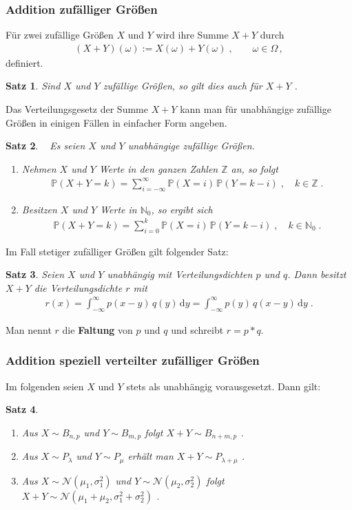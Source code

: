 \documentclass[ngerman,draft,parskip=half,twoside]{scrartcl}
\newtheorem{thm}{Satz}[section]
\newcommand*{\N}{\mathbb{N}}      %
\newcommand*{\Z}{\mathbb{Z}}      %
\newcommand*{\WKM}{\mathbb{P}}      %
\begin{document}
\subsubsection{Addition zufälliger Größen}
Für zwei zufällige Größen $X$  und $Y$ wird ihre Summe $X+Y$ durch
\begin{gather*}
  (X+Y)(\omega):=X(\omega)+Y(\omega)\;,\qquad \omega\in\Omega\,,
\end{gather*}
definiert.
\begin{thm}
Sind $X$ und $Y$ zufällige Größen, so gilt dies auch für $X+Y$ .
\end{thm}
Das Verteilungsgesetz der Summe $X+Y$ kann man für unabhängige zufällige Größen in einigen
Fällen in einfacher Form angeben.
\begin{thm}~
Es seien $X$ und $Y$ unabhängige zufällige Größen.
\begin{enumerate}
\item
Nehmen $X$ und $Y$ Werte in den ganzen Zahlen $\Z$ an, so folgt
  \begin{gather*}
    \WKM(X+Y=k)=\sum_{i=-\infty}^\infty\WKM(X=i)\,\WKM(Y=k-i)\;,\quad k\in \Z\;.
  \end{gather*}
\item
Besitzen $X$ und $Y$ Werte in $\N_0$, so ergibt sich
  \begin{gather*}
    \WKM(X+Y=k)=\sum_{i=0}^k\WKM(X=i)\,\WKM(Y=k-i)\;,\quad k\in \N_0\;.
  \end{gather*}
\end{enumerate}
\end{thm}
Im Fall stetiger zufälliger Größen gilt folgender Satz:
\begin{thm}
Seien $X$ und $Y$ unabhängig mit Verteilungsdichten $p$ und $q$. Dann besitzt $X+Y$
die Verteilungsdichte $r$  mit
  \begin{gather*}
    r(x)=\int_{-\infty}^\infty p(x-y)\,q(y)\,\mathrm d y = \int_{-\infty}^\infty p(y)\,q(x-y)\,\mathrm d y \;.
  \end{gather*}
\end{thm}
Man nennt $r$ die \textbf{Faltung} von $p$ und $q$ und schreibt $r=p*q$.
\subsubsection{Addition speziell verteilter zufälliger Größen}
Im folgenden seien $X$ und $Y$ stets als unabhängig vorausgesetzt. Dann gilt:
\begin{thm}~
  \begin{enumerate}[label=(\alph*)]
   \item
Aus $X\sim B_{n,p}$ und $Y\sim B_{m,p}$ folgt $X+Y\sim B_{n+m,p}$  .
   \item
Aus $X\sim P_\lambda$ und $Y\sim P_\mu$ erhält man $X+Y\sim P_{\lambda+\mu}$ .
   \item
Aus $X\sim\mathcal N(\mu_1,\sigma_1^2)$ und $Y\sim\mathcal N(\mu_2,\sigma_2^2)$ folgt
$X+Y\sim \mathcal N(\mu_1+\mu_2,\sigma_1^2+\sigma_2^2)$ .
  \end{enumerate}
\end{thm}
\end{document}
